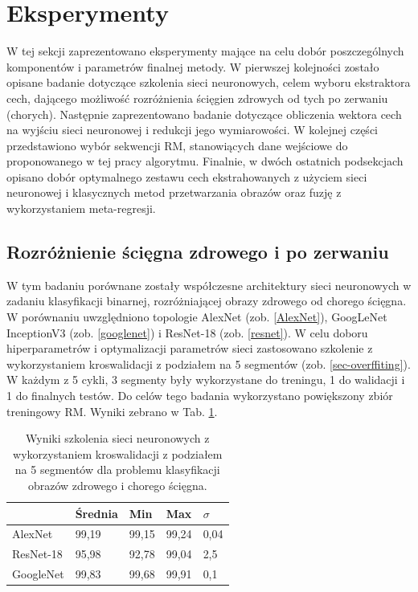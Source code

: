 \section{Eksperymenty}

W tej sekcji zaprezentowano eksperymenty mające na celu dobór poszczególnych komponentów i parametrów finalnej metody. W pierwszej kolejności zostało opisane badanie dotyczące szkolenia sieci neuronowych, celem wyboru ekstraktora cech, dającego możliwość rozróżnienia ścięgien zdrowych od tych po zerwaniu (chorych). Następnie zaprezentowano badanie dotyczące obliczenia wektora cech na wyjściu sieci neuronowej i redukcji jego wymiarowości. W kolejnej części przedstawiono wybór sekwencji RM, stanowiących dane wejściowe do proponowanego w tej pracy algorytmu. Finalnie, w dwóch ostatnich podsekcjach opisano dobór optymalnego zestawu cech ekstrahowanych z użyciem sieci neuronowej i klasycznych metod przetwarzania obrazów oraz fuzję z wykorzystaniem meta-regresji.  


\subsection{Rozróżnienie ścięgna zdrowego i po zerwaniu}
\label{binaryMRI}
W tym badaniu porównane zostały współczesne architektury sieci neuronowych w zadaniu klasyfikacji binarnej, rozróżniającej obrazy zdrowego od chorego ścięgna. W porównaniu uwzględniono topologie AlexNet (zob. \ref{AlexNet}), GoogLeNet InceptionV3 (zob. \ref{googlenet}) i ResNet-18 (zob. \ref{resnet}). W celu doboru hiperparametrów i optymalizacji parametrów sieci zastosowano szkolenie z wykorzystaniem kroswalidacji z podziałem na 5 segmentów (zob. \ref{sec-overffiting}). W każdym z 5 cykli, 3 segmenty były wykorzystane do treningu, 1 do walidacji i 1 do finalnych testów. Do celów tego badania wykorzystano powiększony zbiór treningowy RM. Wyniki zebrano w Tab. \ref{tab:binary-cross-validation}.
\renewcommand{\arraystretch}{1.2}
\begin{table}[h!]
	\setlength{\tabcolsep}{14pt}
	\centering
	\caption{Wyniki szkolenia sieci neuronowych z wykorzystaniem kroswalidacji z podziałem na 5 segmentów dla problemu klasyfikacji obrazów zdrowego i chorego ścięgna.}
	\label{tab:binary-cross-validation}
	\begin{tabular}{l | l | l | l | l }
		 & Średnia & Min   & Max   & $\sigma$   \\ \hline \hline
		AlexNet   & 99,19 & 99,15 & 99,24 & 0,04 \\ \hline
		ResNet-18 & 95,98 & 92,78 & 99,04 & 2,5  \\ \hline
		GoogleNet & 99,83 & 99,68 & 99,91 & 0,1  \\ \hline
	\end{tabular}
\end{table}
\renewcommand{\arraystretch}{1}

